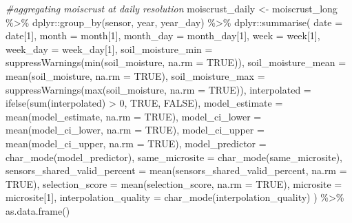 \documentclass[
  table]{article}
\newenvironment{Shaded}{\begin{snugshade}}{\end{snugshade}}
\newcommand{\AttributeTok}[1]{\textcolor[rgb]{0.77,0.63,0.00}{#1}}
\newcommand{\CommentTok}[1]{\textcolor[rgb]{0.56,0.35,0.01}{\textit{#1}}}
\newcommand{\ConstantTok}[1]{\textcolor[rgb]{0.00,0.00,0.00}{#1}}
\newcommand{\DecValTok}[1]{\textcolor[rgb]{0.00,0.00,0.81}{#1}}
\newcommand{\FunctionTok}[1]{\textcolor[rgb]{0.00,0.00,0.00}{#1}}
\newcommand{\NormalTok}[1]{#1}
\newcommand{\OtherTok}[1]{\textcolor[rgb]{0.56,0.35,0.01}{#1}}
\newcommand{\SpecialCharTok}[1]{\textcolor[rgb]{0.00,0.00,0.00}{#1}}
\begin{document}
\begin{Shaded}
\begin{Highlighting}[]
\CommentTok{\#aggregating moiscrust at daily resolution}
\NormalTok{moiscrust\_daily }\OtherTok{\textless{}{-}}\NormalTok{ moiscrust\_long }\SpecialCharTok{\%\textgreater{}\%} 
\NormalTok{  dplyr}\SpecialCharTok{::}\FunctionTok{group\_by}\NormalTok{(sensor, year, year\_day) }\SpecialCharTok{\%\textgreater{}\%} 
\NormalTok{  dplyr}\SpecialCharTok{::}\FunctionTok{summarise}\NormalTok{(}
    \AttributeTok{date =}\NormalTok{ date[}\DecValTok{1}\NormalTok{],}
    \AttributeTok{month =}\NormalTok{ month[}\DecValTok{1}\NormalTok{],}
    \AttributeTok{month\_day =}\NormalTok{ month\_day[}\DecValTok{1}\NormalTok{],}
    \AttributeTok{week =}\NormalTok{ week[}\DecValTok{1}\NormalTok{],}
    \AttributeTok{week\_day =}\NormalTok{ week\_day[}\DecValTok{1}\NormalTok{],}
    \AttributeTok{soil\_moisture\_min =} \FunctionTok{suppressWarnings}\NormalTok{(}\FunctionTok{min}\NormalTok{(soil\_moisture, }\AttributeTok{na.rm =} \ConstantTok{TRUE}\NormalTok{)),}
    \AttributeTok{soil\_moisture\_mean =} \FunctionTok{mean}\NormalTok{(soil\_moisture, }\AttributeTok{na.rm =} \ConstantTok{TRUE}\NormalTok{),}
    \AttributeTok{soil\_moisture\_max =} \FunctionTok{suppressWarnings}\NormalTok{(}\FunctionTok{max}\NormalTok{(soil\_moisture, }\AttributeTok{na.rm =} \ConstantTok{TRUE}\NormalTok{)),}
    \AttributeTok{interpolated =} \FunctionTok{ifelse}\NormalTok{(}\FunctionTok{sum}\NormalTok{(interpolated) }\SpecialCharTok{\textgreater{}} \DecValTok{0}\NormalTok{, }\ConstantTok{TRUE}\NormalTok{, }\ConstantTok{FALSE}\NormalTok{),}
    \AttributeTok{model\_estimate =} \FunctionTok{mean}\NormalTok{(model\_estimate, }\AttributeTok{na.rm =} \ConstantTok{TRUE}\NormalTok{),}
    \AttributeTok{model\_ci\_lower =} \FunctionTok{mean}\NormalTok{(model\_ci\_lower, }\AttributeTok{na.rm =} \ConstantTok{TRUE}\NormalTok{),}
    \AttributeTok{model\_ci\_upper =} \FunctionTok{mean}\NormalTok{(model\_ci\_upper, }\AttributeTok{na.rm =} \ConstantTok{TRUE}\NormalTok{),}
    \AttributeTok{model\_predictor =} \FunctionTok{char\_mode}\NormalTok{(model\_predictor),}
    \AttributeTok{same\_microsite =} \FunctionTok{char\_mode}\NormalTok{(same\_microsite),}
    \AttributeTok{sensors\_shared\_valid\_percent =} \FunctionTok{mean}\NormalTok{(sensors\_shared\_valid\_percent, }\AttributeTok{na.rm =} \ConstantTok{TRUE}\NormalTok{),}
    \AttributeTok{selection\_score =} \FunctionTok{mean}\NormalTok{(selection\_score, }\AttributeTok{na.rm =} \ConstantTok{TRUE}\NormalTok{),}
    \AttributeTok{microsite =}\NormalTok{ microsite[}\DecValTok{1}\NormalTok{],}
    \AttributeTok{interpolation\_quality =} \FunctionTok{char\_mode}\NormalTok{(interpolation\_quality)}
\NormalTok{  ) }\SpecialCharTok{\%\textgreater{}\%} 
  \FunctionTok{as.data.frame}\NormalTok{()}
\end{Highlighting}
\end{Shaded}
\end{document}
